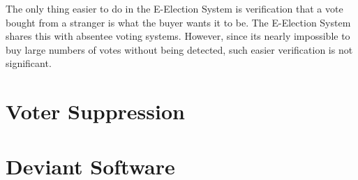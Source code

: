 \documentclass[12pt]{article}
\begin{document}
The only thing easier to do in the E-Election System is verification
that a vote bought from a stranger
is what the buyer wants it to be.  The E-Election
System shares this with absentee voting systems.  However, since its
nearly impossible to buy large numbers of votes without being detected,
such easier verification is not significant.

\section{Voter Suppression}

\section{Deviant Software}
\label{DEVIANT-SOFTWARE}
\end{document}
